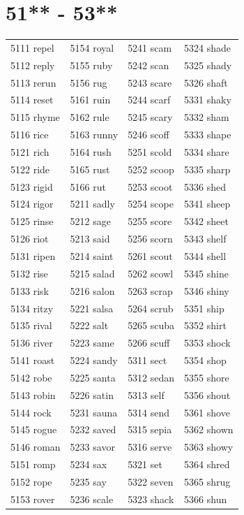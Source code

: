 \documentclass[12pt, oneside]{book}
\begin{document}
	\begin{table}[h]
		\centering
		\section*{51** - 53**}
		\begin{tabular}{l l l l}
			5111 repel & 5154 royal & 5241 scam & 5324 shade\\
			5112 reply & 5155 ruby & 5242 scan & 5325 shady\\
			5113 rerun & 5156 rug & 5243 scare & 5326 shaft\\
			5114 reset & 5161 ruin & 5244 scarf & 5331 shaky\\
			5115 rhyme & 5162 rule & 5245 scary & 5332 sham\\
			5116 rice & 5163 runny & 5246 scoff & 5333 shape\\
			5121 rich & 5164 rush & 5251 scold & 5334 share\\
			5122 ride & 5165 rust & 5252 scoop & 5335 sharp\\
			5123 rigid & 5166 rut & 5253 scoot & 5336 shed\\
			5124 rigor & 5211 sadly & 5254 scope & 5341 sheep\\
			5125 rinse & 5212 sage & 5255 score & 5342 sheet\\
			5126 riot & 5213 said & 5256 scorn & 5343 shelf\\
			5131 ripen & 5214 saint & 5261 scout & 5344 shell\\
			5132 rise & 5215 salad & 5262 scowl & 5345 shine\\
			5133 risk & 5216 salon & 5263 scrap & 5346 shiny\\
			5134 ritzy & 5221 salsa & 5264 scrub & 5351 ship\\
			5135 rival & 5222 salt & 5265 scuba & 5352 shirt\\
			5136 river & 5223 same & 5266 scuff & 5353 shock\\
			5141 roast & 5224 sandy & 5311 sect & 5354 shop\\
			5142 robe & 5225 santa & 5312 sedan & 5355 shore\\
			5143 robin & 5226 satin & 5313 self & 5356 shout\\
			5144 rock & 5231 sauna & 5314 send & 5361 shove\\
			5145 rogue & 5232 saved & 5315 sepia & 5362 shown\\
			5146 roman & 5233 savor & 5316 serve & 5363 showy\\
			5151 romp & 5234 sax & 5321 set & 5364 shred\\
			5152 rope & 5235 say & 5322 seven & 5365 shrug\\
			5153 rover & 5236 scale & 5323 shack & 5366 shun\\
			
		\end{tabular}
	\end{table}
	
\end{document}
